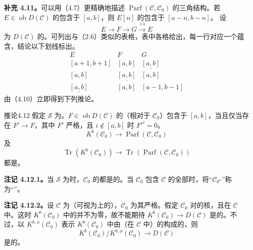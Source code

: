 \textbf{补充 4.11。}可以用（4.7）更精确地描述 $\operatorname{Parf}(\mathcal C,\mathcal C_0)$ 的三角结构。若 $E\in\operatorname{ob}D(\mathcal C)$ 的包含于 $[a,b]$，则 $E[n]$ 的包含于 $[a-n,b-n]$。
设
\[E\longrightarrow F\longrightarrow G\xrightarrow{+1}E\]
为 $D(\mathcal C)$ 的。可列出与（2.6）类似的表格，表中各格给出，每一行对应一个蕴含，结论以下划线标出。
\[
\begin{array}{ccc}
E&F&G\\[2pt]
[a+1,b+1]&[a,b]&\underline{[a,b]}\\
{}[a,b]&\underline{[a,b]}&[a,b]\\
\underline{[a,b]}&[a,b]&[a-1,b-1]
\end{array}
\]
由（4.10）立即得到下列推论。

\begin{SGAresult}{推论}{4.12}
假定 $\mathscr S$ 为。$F\in\operatorname{ob}D(\mathcal C)$ 的（相对于 $\mathcal C_0$）包含于 $[a,b]$，当且仅当存在 $F'\to F$，其中 $F'$ 严格，且 $i\notin[a,b]$ 时 $F'^i=0$。
\[K^b(\mathcal C_0)\longrightarrow\operatorname{Parf}(\mathcal C,\mathcal C_0)\]
及
\[\operatorname{Tr}(K^b(\mathcal C_0))\longrightarrow\operatorname{Tr}(\operatorname{Parf}(\mathcal C,\mathcal C_0))\]
都是。
\end{SGAresult}

\textbf{注记 4.12.1。}当 $\mathscr S$ 为时，$\mathcal C_0$ 的都是的。当 $\mathcal C_0$ 包含 $\mathcal C$ 的全部时，将“$\mathcal C_0$-”称为“”。

\textbf{注记 4.12.2。}设 $\mathcal C$ 为（可视为上的），$\mathcal C_0$ 为其严格。假定 $\mathcal C_0$ 对的核，且在 $\mathcal C$ 中。这时 $K^b(\mathcal C_0)$ 中的并不为零，故不能期待 $K^b(\mathcal C_0)\to D(\mathcal C)$ 是的。不过，以 $K^{b,\phi}(\mathcal C_0)$ 表示 $K^b(\mathcal C_0)$ 中由（在 $\mathcal C$ 中）的构成的，则
\[K^b(\mathcal C_0)/K^{b,\phi}(\mathcal C_0)\longrightarrow D(\mathcal C)\]
是的。

